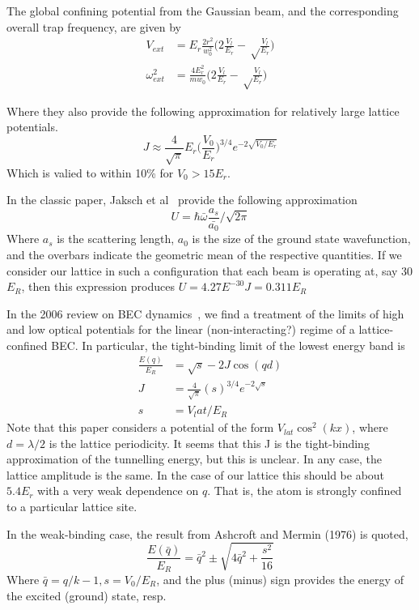 The global confining potential from the Gaussian beam, and the corresponding overall trap frequency, are given by 
\begin{equation}
\begin{split}
	V_{ext} &= E_r \frac{2 r^2}{w_0^2}\big( 2\frac{V_l}{E_r} -\sqrt\frac{V_l}{E_r}\big)\\
	\omega_{ext}^2 &= \frac{4 E_r^2}{m w_0} \big(2\frac{V_l}{E_r} - \sqrt\frac{V_l}{E_r}\big)
\end{split}
\end{equation}

Where they also provide the following approximation for relatively large lattice potentials.
\begin{equation}
J \approx \frac{4}{\sqrt{\pi}} E_r\Big(\frac{V_0}{E_r}\Big)^{3/4}e^{-2\sqrt{V_0/E_r}}
\end{equation}
Which is valied to within 10\% for $V_0>15E_r$. \cite{MPSBand,MBPhys}

In the classic paper, Jaksch et al~\cite{ColdBosons} provide the following approximation
\begin{equation}
	U = \hbar \bar{\omega}\frac{a_s}{\bar{a_0}}/\sqrt{2\pi}
\end{equation}
Where $a_s$ is the scattering length, $a_0$ is the size of the ground state wavefunction, and the overbars indicate the geometric mean of the respective quantities. If we consider our lattice in such a configuration that each beam is operating at, say 30$E_R$, then this expression produces $ U = 4.27E^{-30}J = 0.311 E_R$

In the 2006 review on BEC dynamics~\cite{BECDyn}, we find a treatment of the limits of high and low optical potentials for the linear (non-interacting?) regime of a lattice-confined BEC. In particular, the tight-binding limit of the lowest energy band is
\begin{equation}
\begin{split}
	\frac{E(q)}{E_R} &= \sqrt{s} - 2J\cos(qd)\\
	J &= \frac{4}{\sqrt{\pi}} (s)^{3/4} e^{-2\sqrt{s}}\\
	s&=V_lat/E_R
\end{split}
\end{equation}
Note that this paper considers a potential of the form $V_{lat} \cos^2(kx)$, where $d=\lambda/2$ is the lattice periodicity. It seems that this J is the tight-binding approximation of the tunnelling energy, but this is unclear. In any case, the lattice amplitude is the same. In the case of our lattice this should be about $5.4 E_r$ with a very weak dependence on $q$. That is, the atom is strongly confined to a particular lattice site. 


In the weak-binding case, the result from Ashcroft and Mermin (1976) is quoted,
\begin{equation}
	\frac{E(\bar{q})}{E_R} = \bar{q}^2 \pm\sqrt{4\bar{q}^2+\frac{s^2}{16}}
\end{equation}
Where $\bar{q} = q/k-1, s=V_0/E_R$, and the plus (minus) sign provides the energy of the excited (ground) state, resp.